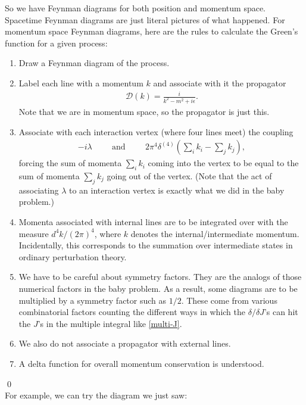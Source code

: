 \documentclass{book}
\theoremstyle{definition}
\newcommand{\f}[2]{\frac{#1}{#2}}
\newcommand{\lp}{\left(}
\newcommand{\rp}{\right)}
\newcommand{\D}{\mathcal{D}}
\begin{document}
So we have Feynman diagrams for both position and momentum space. Spacetime Feynman diagrams are just literal pictures of what happened. For momentum space Feynman diagrams, here are the rules to calculate the Green's function for a given process:
\begin{enumerate}
	\item Draw a Feynman diagram of the process.
	\item Label each line with a momentum $k$ and associate with it the propagator
	\begin{align}
	\D(k) = \f{i}{k^2 - m^2 + i\epsilon}.
	\end{align}
	Note that we are in momentum space, so the propagator is just this. 
	\item Associate with each interaction vertex (where four lines meet) the coupling 
	\begin{align}
	-i\lambda \hspace{1cm} \text{and} \hspace{1cm}  2\pi^4\delta^{(4)}\lp\sum_i k_i -\sum_j k_j\rp,
	\end{align}
	forcing the sum of momenta $\sum_i k_i$ coming into the vertex to be equal to the sum of momenta $\sum_j k_j$ going out of the vertex. (Note that the act of associating $\lambda$ to an interaction vertex is exactly what we did in the baby problem.)
	\item Momenta associated with internal lines are to be integrated over with the measure $d^4k / (2\pi)^4$, where $k$ denotes the internal/intermediate momentum. Incidentally, this corresponds to the summation over intermediate states in ordinary perturbation theory. 
	\item We have to be careful about symmetry factors. They are the analogs of those numerical factors in the baby problem. As a result, some diagrams are to be multiplied by a symmetry factor such as $1/2$. These come from various combinatorial factors counting the different ways in which the $\delta/\delta J$'s can hit the $J$'s in the multiple integral like \eqref{multi-J}.
	\item We also do not associate a propagator with external lines. 
	\item A delta function for overall momentum conservation is understood. 
\end{enumerate}\qed\\


For example, we can try the diagram we just saw:
\end{document}
